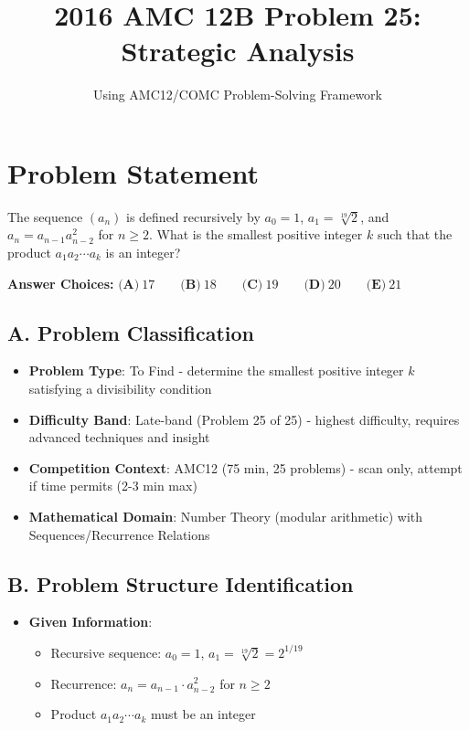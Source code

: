\documentclass[11pt]{article}
\title{\textbf{2016 AMC 12B Problem 25: Strategic Analysis}}
\author{Using AMC12/COMC Problem-Solving Framework}
\date{}
\begin{document}
\maketitle

\section*{Problem Statement}
The sequence $(a_n)$ is defined recursively by $a_0=1$, $a_1=\sqrt[19]{2}$, and $a_n=a_{n-1}a_{n-2}^2$ for $n\geq 2$. What is the smallest positive integer $k$ such that the product $a_1a_2\cdots a_k$ is an integer?

\textbf{Answer Choices:} 
$\textbf{(A)}\ 17\qquad\textbf{(B)}\ 18\qquad\textbf{(C)}\ 19\qquad\textbf{(D)}\ 20\qquad\textbf{(E)}\ 21$

\begin{problemconfigbox}
\subsection*{A. Problem Classification}
\begin{itemize}[leftmargin=*]
    \item \textbf{Problem Type}: To Find - determine the smallest positive integer $k$ satisfying a divisibility condition
    \item \textbf{Difficulty Band}: Late-band (Problem 25 of 25) - highest difficulty, requires advanced techniques and insight
    \item \textbf{Competition Context}: AMC12 (75 min, 25 problems) - scan only, attempt if time permits (2-3 min max)
    \item \textbf{Mathematical Domain}: Number Theory (modular arithmetic) with Sequences/Recurrence Relations
\end{itemize}

\subsection*{B. Problem Structure Identification}
\begin{itemize}[leftmargin=*]
    \item \textbf{Given Information}: 
    \begin{itemize}
        \item Recursive sequence: $a_0 = 1$, $a_1 = \sqrt[19]{2} = 2^{1/19}$
        \item Recurrence: $a_n = a_{n-1} \cdot a_{n-2}^2$ for $n \geq 2$
        \item Product $a_1a_2\cdots a_k$ must be an integer
    \end{itemize}
    

\end{itemize}
\end{problemconfigbox}
\end{document}
